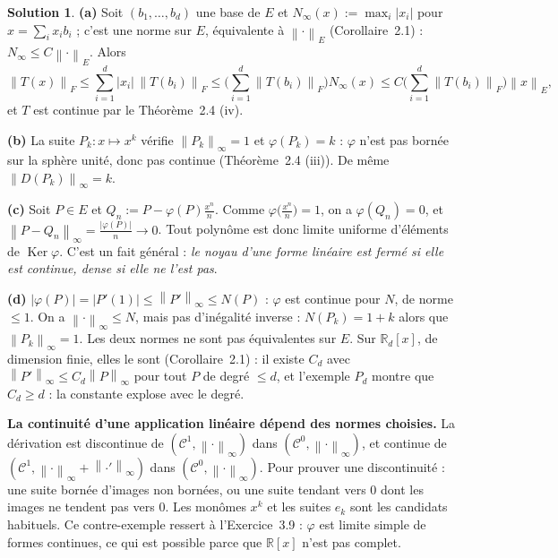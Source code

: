 \documentclass[11pt,a4paper]{article}
\newcommand{\R}{\mathbb{R}}
\newcommand{\norm}[1]{\left\|#1\right\|}
\newcommand{\Cz}{\mathcal{C}^0}
\DeclareMathOperator{\Ker}{Ker}
\theoremstyle{definition}
\newtheorem*{solution}{Solution}
\begin{document}
\begin{solution}
\noindent\textbf{(a)} Soit $(b_1,\dots,b_d)$ une base de $E$ et $N_\infty(x):=\max_i|x_i|$ pour $x=\sum_ix_ib_i$ ; c'est une norme sur $E$, équivalente à $\norm\cdot_E$ (Corollaire~2.1) : $N_\infty\le C\norm\cdot_E$. Alors
\[
\norm{T(x)}_F\le\sum_{i=1}^d|x_i|\,\norm{T(b_i)}_F\le\Big(\sum_{i=1}^d\norm{T(b_i)}_F\Big)N_\infty(x)\le C\Big(\sum_{i=1}^d\norm{T(b_i)}_F\Big)\norm x_E ,
\]
et $T$ est continue par le Théorème~2.4 (iv).

\medskip
\noindent\textbf{(b)} La suite $P_k:x\mapsto x^k$ vérifie $\norm{P_k}_\infty=1$ et $\varphi(P_k)=k$ : $\varphi$ n'est pas bornée sur la sphère unité, donc pas continue (Théorème~2.4 (iii)). De même $\norm{D(P_k)}_\infty=k$.

\medskip
\noindent\textbf{(c)} Soit $P\in E$ et $Q_n:=P-\varphi(P)\frac{x^n}n$. Comme $\varphi\big(\frac{x^n}n\big)=1$, on a $\varphi(Q_n)=0$, et $\norm{P-Q_n}_\infty=\frac{|\varphi(P)|}n\to0$. Tout polynôme est donc limite uniforme d'éléments de $\Ker\varphi$. C'est un fait général : \emph{le noyau d'une forme linéaire est fermé si elle est continue, dense si elle ne l'est pas}.

\medskip
\noindent\textbf{(d)} $|\varphi(P)|=|P'(1)|\le\norm{P'}_\infty\le N(P)$ : $\varphi$ est continue pour $N$, de norme $\le1$. On a $\norm\cdot_\infty\le N$, mais pas d'inégalité inverse : $N(P_k)=1+k$ alors que $\norm{P_k}_\infty=1$. Les deux normes ne sont pas équivalentes sur $E$. Sur $\R_d[x]$, de dimension finie, elles le sont (Corollaire~2.1) : il existe $C_d$ avec $\norm{P'}_\infty\le C_d\norm P_\infty$ pour tout $P$ de degré $\le d$, et l'exemple $P_d$ montre que $C_d\ge d$ : la constante explose avec le degré.
\end{solution}

\begin{piege}
\textbf{La continuité d'une application linéaire dépend des normes choisies.} La dérivation est discontinue de $(\mathcal C^1,\norm\cdot_\infty)$ dans $(\Cz,\norm\cdot_\infty)$, et continue de $(\mathcal C^1,\norm\cdot_\infty+\norm{\cdot'}_\infty)$ dans $(\Cz,\norm\cdot_\infty)$. Pour prouver une discontinuité : une suite bornée d'images non bornées, ou une suite tendant vers $0$ dont les images ne tendent pas vers $0$. Les monômes $x^k$ et les suites $e_k$ sont les candidats habituels. Ce contre-exemple ressert à l'Exercice~3.9 : $\varphi$ est limite simple de formes continues, ce qui est possible parce que $\R[x]$ n'est pas complet.
\end{piege}
\end{document}
